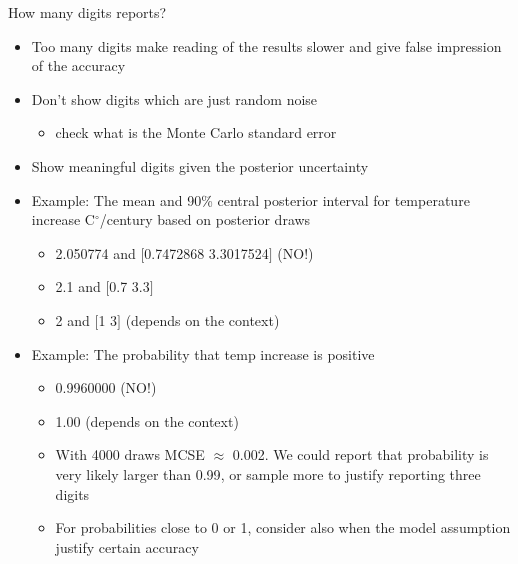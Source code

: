 \documentclass[english,t]{beamer}
\begin{document}
\begin{frame}{How many digits reports?}

\vspace{-0.5\baselineskip}  
  \begin{itemize}
  \item Too many digits make reading of the results slower and give
    false impression of the accuracy
  \item<2-> Don't show digits which are just random noise
    \begin{itemize}
    \item check what is the Monte Carlo standard error
    \end{itemize}
  \item<3-> Show meaningful digits given the posterior uncertainty
  \item<4-> Example: The mean and 90\% central posterior interval for temperature
     increase C$^\circ$/century based on posterior draws
     \begin{itemize}
     \item<5-> {\color{red} 2.050774 and $[$0.7472868 3.3017524$]$} (NO!)
     \item<6-> {\color{darkgreen} 2.1 and $[$0.7 3.3$]$}
    \item<7-> {\color{navyblue} 2 and $[$1 3$]$} (depends on the context)
     \end{itemize}
   \item<8-> Example: The probability that temp increase is
     positive
     \begin{itemize}
     \item<9-> {\color{red} 0.9960000} (NO!)
     \item<10-> {\color{navyblue} 1.00} (depends on the context)
     \item<11-> With 4000 draws MCSE $\approx$ 0.002. We could report
       that probability is {\color{darkgreen} very likely larger than 0.99}, or sample
       more to justify reporting three digits
     \item<12-> For probabilities close to 0 or 1, consider also when
       the model assumption justify certain accuracy
     \end{itemize}
  \end{itemize}

  
\end{frame}
\end{document}
